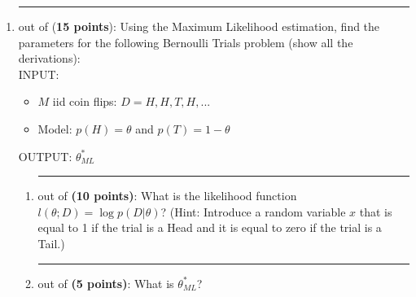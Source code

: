 \documentclass{article}%
\begin{document}
\begin{enumerate}
\item \rule{0.5 in}{1 pt} out of (\textbf{15 points}): Using the Maximum Likelihood estimation, find the parameters for the following Bernoulli Trials problem (show all the derivations):\\
INPUT: 
\begin{itemize}
	\item $M$ iid coin flips: $D={H, H, T, H,...}$
	\item Model: $p(H) = \theta$ and $p(T)=1-\theta$
\end{itemize}
OUTPUT: $\theta _{ML}^* $
\begin{enumerate}
		\item \rule{0.5 in}{1 pt} out of \textbf{(10 points)}: What is the likelihood function $l(\theta; D)=\log p(D|\theta)$? (Hint: Introduce a random variable $x$ that is equal to 1 if the trial is a Head and it is equal to zero if the trial is a Tail.) 
		

		\item \rule{0.5 in}{1 pt} out of \textbf{(5 points)}: What is $\theta _{ML}^* $?\\
	\end{enumerate}
	


\end{enumerate}
\end{document}
